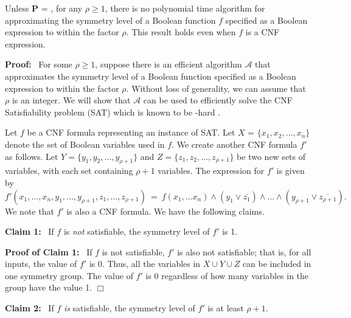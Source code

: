 \newcommand{\cala}{\mbox{$\mathcal{A}$}}

\begin{theorem}\label{thm:approx_sym_level_hard}
Unless \textbf{P} = \cnp,
for any $\rho \geq 1$, there is no polynomial time 
algorithm for approximating the 
symmetry level of a Boolean function $f$ 
specified as a Boolean expression to within the factor $\rho$.
This result holds even when $f$ is a CNF expression.
\end{theorem}

\noindent
\textbf{Proof:}~ For some $\rho \geq 1$, suppose there is an efficient algorithm \cala{} 
that approximates the symmetry level of a Boolean function
specified as a Boolean expression to within the factor $\rho$.
Without loss of generality, we can assume that $\rho$ is an integer.
We will show that \cala{} can be used to efficiently solve
the CNF Satisfiability problem (SAT) which is known 
to be \cnp-hard \cite{GJ-1979}.

Let $f$ be a CNF formula representing an instance of SAT.
Let $X$ = $\{x_1, x_2, \ldots, x_n\}$ denote the set of
Boolean variables used in $f$.
We create another CNF formula $f'$ as follows.
Let $Y = \{y_1, y_2, \ldots, y_{\rho+1}\}$ and
$Z = \{z_1, z_2, \ldots, z_{\rho+1}\}$ be two 
new sets of variables, with each set containing $\rho+1$ variables.
The expression for $f'$ is given by
\[
f'(x_1, \ldots, x_n, y_1, \ldots, y_{\rho+1},
z_1, \ldots, z_{\rho+1}) ~=~ 
    f(x_1, \ldots x_n) \wedge (y_1 \vee \overline{z_1}) \wedge \ldots \wedge
                              (y_{\rho+1} \vee \overline{z_{\rho+1}}).
\]
We note that $f'$ is also a CNF formula.
We have the following claims.

\medskip

\noindent
\textbf{Claim 1:}~ If $f$ is \emph{not} satisfiable, 
the symmetry level of $f'$ is 1.

\smallskip

\noindent
\textbf{Proof of Claim 1:}~ If $f$ is not satisfiable, $f'$ is also
not satisfiable; that is, for all inputs, the value of $f'$ is 0.
Thus, all the variables in $X \cup Y \cup Z$ can be included in one
symmetry group.
The value of $f'$ is 0 regardless of how many variables in the
group have the value 1.  \hfill$\Box$

\medskip

\noindent
\textbf{Claim 2:}~ If $f$ \emph{is} satisfiable, 
the symmetry level of $f'$ is at least $\rho+1$.

\smallskip

